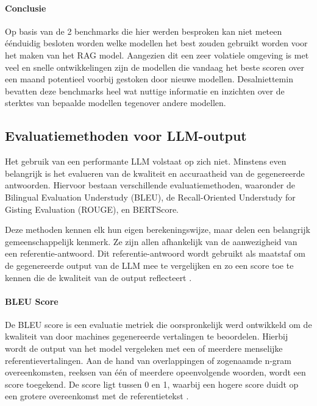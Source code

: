     \paragraph{Conclusie}
    
    Op basis van de 2 benchmarks die hier werden besproken kan niet meteen éénduidig besloten worden welke modellen het best zouden gebruikt worden voor het maken van het RAG model. Aangezien dit een zeer volatiele omgeving is met veel en snelle ontwikkelingen zijn de modellen die vandaag het beste scoren over een maand potentieel voorbij gestoken door nieuwe modellen. Desalniettemin bevatten deze benchmarks heel wat nuttige informatie en inzichten over de sterktes van bepaalde modellen tegenover andere modellen. 
    
    \subsection{Evaluatiemethoden voor LLM-output}
   
    Het gebruik van een performante LLM volstaat op zich niet. Minstens even belangrijk is het evalueren van de kwaliteit en accuraatheid van de gegenereerde antwoorden. Hiervoor bestaan verschillende evaluatiemethoden, waaronder de Bilingual Evaluation Understudy (BLEU), de Recall-Oriented Understudy for Gisting Evaluation (ROUGE), en BERTScore.  
    
    Deze methoden kennen elk hun eigen berekeningswijze, maar delen een belangrijk gemeenschappelijk kenmerk. Ze zijn allen afhankelijk van de aanwezigheid van een referentie-antwoord. Dit referentie-antwoord wordt gebruikt als maatstaf om de gegenereerde output van de LLM mee te vergelijken en zo een score toe te kennen die de kwaliteit van de output reflecteert \cite{microsoft2024evaluation}.
    
    \paragraph{BLEU Score}
    
    De BLEU score is een evaluatie metriek die oorspronkelijk werd ontwikkeld om de kwaliteit van door machines gegenereerde vertalingen te beoordelen. Hierbij wordt de output van het model vergeleken met een of meerdere menselijke referentievertalingen. Aan de hand van overlappingen of zogenaamde n-gram overeenkomsten, reeksen van één of meerdere opeenvolgende woorden, wordt een score toegekend. De score ligt tussen 0 en 1, waarbij een hogere score duidt op een grotere overeenkomst met de referentietekst \cite{papineni-etal-2002-bleu}.
    
